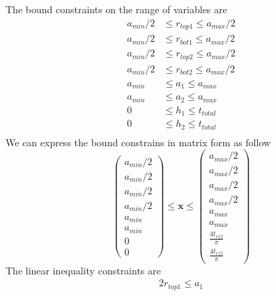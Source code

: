 \documentclass[12pt]{article}
\numberwithin{equation}{section}
\DeclarePairedDelimiter\floor{\lfloor}{\rfloor}
\numberwithin{equation}{section}
\begin{document}
\begin{outline}[enumerate]
The bound constraints on the range of variables are
\begin{align*}
a_{min}/2 & \leq r_{top1} \leq a_{max}/2 \\
a_{min}/2 & \leq r_{bot1} \leq a_{max}/2 \\
a_{min}/2 & \leq r_{top2} \leq a_{max}/2 \\
a_{min}/2 & \leq r_{bot2} \leq a_{max}/2 \\
a_{min} & \leq a_{1} \leq a_{max} \\
a_{min} & \leq a_{2} \leq a_{max} \\
0 & \leq h_1 \leq t_{total}  \\
0 & \leq h_2 \leq t_{total}  \\
\end{align*}
We can express the bound constrains in matrix form as follow
\begin{equation}
\left(
\begin{matrix}
a_{min}/2\\ 
a_{min}/2\\ 
a_{min}/2\\ 
a_{min}/2\\
a_{min}\\ 
a_{min}\\ 
0 \\
0 
\end{matrix} \right )
\leq \mathbf{x}
 \leq 
 \left(
\begin{matrix}
a_{max}/2 \\ a_{max}/2 \\ a_{max}/2 \\ a_{max}/2 \\ a_{max} \\ a_{max} \\  \frac{4 t_{eff}}{\pi}  \\\frac{4 t_{eff}}{\pi} 
\end{matrix} \right )
\end{equation}
The linear inequality constraints are 
\begin{align*} 
2r_{top1} \leq a_1 \\

\end{align*}
\end{outline}
\end{document}
